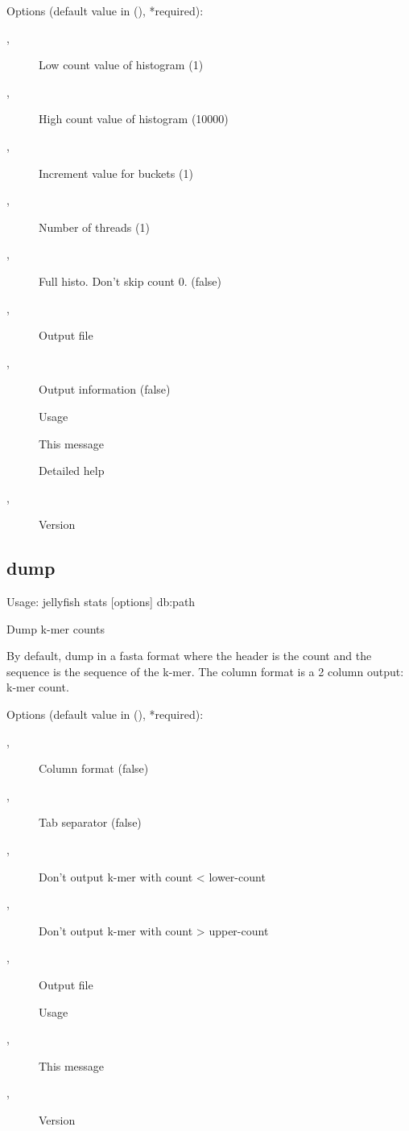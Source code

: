 \noindent Options (default value in (), *required):
\begin{description}
\item[,] \noindent Low count value of histogram (1)
\item[,] \noindent High count value of histogram (10000)
\item[,] \noindent Increment value for buckets (1)
\item[,] \noindent Number of threads (1)
\item[,] \noindent Full histo. Don't skip count 0. (false)
\item[,] \noindent Output file
\item[,] \noindent Output information (false)
\item[] \noindent Usage
\item[] \noindent This message
\item[] \noindent Detailed help
\item[,] \noindent Version
\end{description}
\subsection{dump}
\noindent Usage: jellyfish stats [options] db:path

\noindent Dump k-mer counts

\noindent By default, dump in a fasta format where the header is the count and
\noindent the sequence is the sequence of the k-mer. The column format is a 2
\noindent column output: k-mer count.

\noindent Options (default value in (), *required):
\begin{description}
\item[,] \noindent Column format (false)
\item[,] \noindent Tab separator (false)
\item[,] \noindent Don't output k-mer with count < lower-count
\item[,] \noindent Don't output k-mer with count > upper-count
\item[,] \noindent Output file
\item[] \noindent Usage
\item[,] \noindent This message
\item[,] \noindent Version
\end{description}
